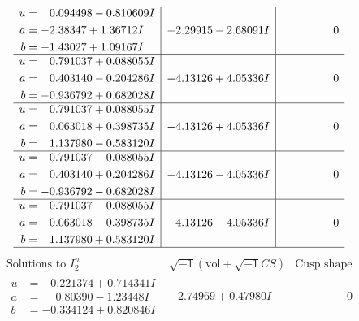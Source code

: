 \documentclass[1p]{elsarticle_modified}
\theoremstyle{definition}
\newcommand{\I}{\sqrt{-1}}
\begin{document}
$$\begin{array}{c|c|c}
\begin{aligned}
u &= \phantom{-}0.094498 - 0.810609 I \\
a &= -2.38347 + 1.36712 I \\
b &= -1.43027 + 1.09167 I\end{aligned}
 & -2.29915 - 2.68091 I & \phantom{-0.000000 } 0 \\ \hline\begin{aligned}
u &= \phantom{-}0.791037 + 0.088055 I \\
a &= \phantom{-}0.403140 - 0.204286 I \\
b &= -0.936792 + 0.682028 I\end{aligned}
 & -4.13126 + 4.05336 I & \phantom{-0.000000 } 0 \\ \hline\begin{aligned}
u &= \phantom{-}0.791037 + 0.088055 I \\
a &= \phantom{-}0.063018 + 0.398735 I \\
b &= \phantom{-}1.137980 - 0.583120 I\end{aligned}
 & -4.13126 + 4.05336 I & \phantom{-0.000000 } 0 \\ \hline\begin{aligned}
u &= \phantom{-}0.791037 - 0.088055 I \\
a &= \phantom{-}0.403140 + 0.204286 I \\
b &= -0.936792 - 0.682028 I\end{aligned}
 & -4.13126 - 4.05336 I & \phantom{-0.000000 } 0 \\ \hline\begin{aligned}
u &= \phantom{-}0.791037 - 0.088055 I \\
a &= \phantom{-}0.063018 - 0.398735 I \\
b &= \phantom{-}1.137980 + 0.583120 I\end{aligned}
 & -4.13126 - 4.05336 I & \phantom{-0.000000 } 0\\
 \hline 
 \end{array}$$\newpage$$\begin{array}{c|c|c}  
\text{Solutions to }I^u_{2}& \I (\text{vol} + \sqrt{-1}CS) & \text{Cusp shape}\\
 \hline 
\begin{aligned}
u &= -0.221374 + 0.714341 I \\
a &= \phantom{-}0.80390 - 1.23448 I \\
b &= -0.334124 + 0.820846 I\end{aligned}
 & -2.74969 + 0.47980 I & \phantom{-0.000000 } 0 \\ \hline\begin{aligned}

\end{aligned}
\end{array}$$
\end{document}
